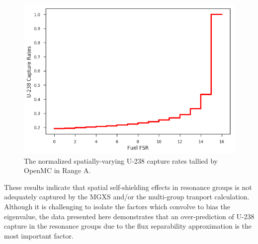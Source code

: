 \begin{figure}[h!]
\centering
\includegraphics[width=\linewidth]{figures/u238-capt-rates-fuel-fsrs}
\caption{The normalized spatially-varying U-238 capture rates tallied by OpenMC in Range A.}
\label{fig:u238-capture-space}
\end{figure}

These results indicate that spatial self-shielding effects in resonance groups is not adequately captured by the MGXS and/or the multi-group tranport calculation. Although it is challenging to isolate the factors which convolve to bias the eigenvalue, the data presented here demonstrates that an over-prediction of U-238 capture in the resonance groups due to the flux separability approximation is the most important factor.